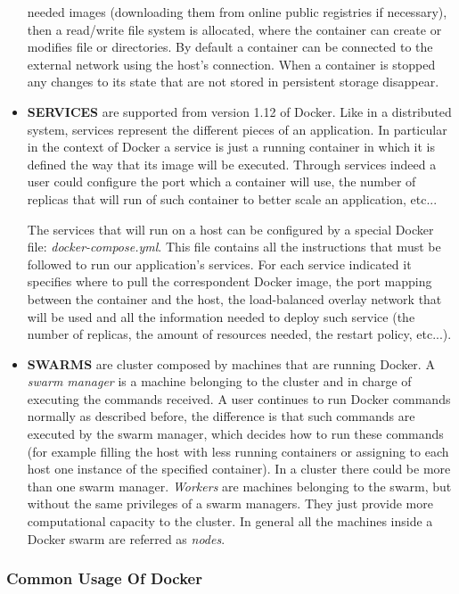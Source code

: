 \documentclass[a4paper,12pt]{article}
\begin{document}
\begin{itemize}
  needed images (downloading them from online public registries if necessary),
  then a read/write file system is allocated, where the container can create or
  modifies file or directories.  By default a container can be connected to the
  external network using the host's connection. When a container is stopped  any
  changes to its state that are not stored in persistent storage disappear.
  \item \textbf{SERVICES} are supported from version 1.12 of Docker. Like in a
  distributed system, services represent the different pieces of an application.
  In particular in the context of Docker a service is just a running container
  in which it is defined the way that its image will be executed. Through
  services indeed a user could configure the port which a container will use,
  the number of replicas that will run of such container to better scale an
  application, etc... \par The services that will run on a host can be
  configured by a special Docker file: \textit{docker-compose.yml}. This file
  contains all the instructions that must be followed to run our application's
  services. For each service indicated it specifies where to pull the
  correspondent Docker image, the port mapping between the container and the
  host, the load-balanced overlay network that will be used and all the
  information needed to deploy such service (the number of replicas, the amount
  of resources needed, the restart policy, etc...).
  \item \textbf{SWARMS} are cluster composed by machines that are running
  Docker. A \textit{swarm manager} is a machine belonging to the cluster and in
  charge of executing the commands received. A user continues to run Docker
  commands normally as described before, the difference is that such commands
  are executed by the swarm manager, which decides how to run these commands
  (for example filling the host with less running containers or assigning to
  each host one instance of the specified container). In a cluster there could
  be more than one swarm manager. \textit{Workers} are machines belonging to the
  swarm, but without the same privileges of a swarm managers. They just provide
  more computational capacity to the cluster. In general all the machines inside
  a Docker swarm are referred as \textit{nodes}.
\end{itemize}

\subsubsection{Common Usage Of Docker}
\end{document}
